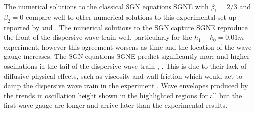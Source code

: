 \documentclass[10pt]{elsarticle}
\providecommand{\DIFaddtex}[1]{{\protect\color{blue} \sf #1}} %
\providecommand{\DIFdeltex}[1]{{\protect\color{red} \scriptsize #1}} %
\providecommand{\DIFaddbegin}{} %
\providecommand{\DIFaddend}{} %
\providecommand{\DIFdelbegin}{} %
\providecommand{\DIFdelend}{} %
\providecommand{\DIFadd}[1]{\texorpdfstring{\DIFaddtex{#1}}{#1}} %
\providecommand{\DIFdel}[1]{\texorpdfstring{\DIFdeltex{#1}}{}} %
\newcommand{\DIFscaledelfig}{0.5}
\newlength{\DIFdelgraphicswidth} %
\newlength{\DIFdelgraphicsheight} %
\newcommand{\DIFaddincludegraphics}[2][]{{\color{blue}\fbox{\DIFOincludegraphics[#1]{#2}}}} %
\newcommand{\DIFdelincludegraphics}[2][]{%
\sbox{\DIFdelgraphicsbox}{\DIFOincludegraphics[#1]{#2}}%
\settoboxwidth{\DIFdelgraphicswidth}{\DIFdelgraphicsbox} %
\settoboxtotalheight{\DIFdelgraphicsheight}{\DIFdelgraphicsbox} %
\scalebox{\DIFscaledelfig}{%
\parbox[b]{\DIFdelgraphicswidth}{\usebox{\DIFdelgraphicsbox}\\[-\baselineskip] \rule{\DIFdelgraphicswidth}{0em}}\llap{\resizebox{\DIFdelgraphicswidth}{\DIFdelgraphicsheight}{%
\setlength{\unitlength}{\DIFdelgraphicswidth}%
\begin{picture}(1,1)%
\thicklines\linethickness{2pt} %
{\color[rgb]{1,0,0}\put(0,0){\framebox(1,1){}}}%
{\color[rgb]{1,0,0}\put(0,0){\line( 1,1){1}}}%
{\color[rgb]{1,0,0}\put(0,1){\line(1,-1){1}}}%
\end{picture}%
}\hspace*{3pt}}} %
} %
\DeclareRobustCommand{\DIFaddbegin}{\DIFOaddbegin \let\includegraphics\DIFaddincludegraphics} %
\DeclareRobustCommand{\DIFaddend}{\DIFOaddend \let\includegraphics\DIFOincludegraphics} %
\DeclareRobustCommand{\DIFdelbegin}{\DIFOdelbegin \let\includegraphics\DIFdelincludegraphics} %
\DeclareRobustCommand{\DIFdelend}{\DIFOaddend \let\includegraphics\DIFOincludegraphics} %
\begin{document}
The numerical solutions to the classical \DIFdelbegin \DIFdel{SGN equations }\DIFdelend \DIFaddbegin \DIFadd{SGNE }\DIFaddend with $\beta_1 = 2/3$ and $\beta_2 = 0$ compare well to other numerical solutions to this experimental set up reported by \citet{Zoppou-etal-2017} and \citet{Pitt-2019}. The numerical solutions to the \DIFdelbegin \DIFdel{SGN capture }\DIFdelend \DIFaddbegin \DIFadd{SGNE reproduce }\DIFaddend the front of the dispersive wave train well, particularly for the $h_1 - h_0 = 0.01m$ experiment, however this agreement worsens as time and the location of the wave gauge increases. The \DIFdelbegin \DIFdel{SGN equations }\DIFdelend \DIFaddbegin \DIFadd{SGNE }\DIFaddend predict significantly more and higher oscillations in the tail of the dispersive wave train\DIFdelbegin \DIFdel{, }\DIFdelend \DIFaddbegin \DIFadd{. This is }\DIFaddend due to their lack of diffusive physical effects, such as viscosity and wall friction which \DIFdelbegin \DIFdel{would }\DIFdelend act to damp the dispersive wave train in the experiment \cite{Pitt-2018-61}. \DIFaddbegin \DIFadd{Wave envelopes produced by the trends in oscillation height shown in the highlighted regions for all but the first wave gauge are longer and arrive later than the experimental results.
}\DIFaddend 
\end{document}
